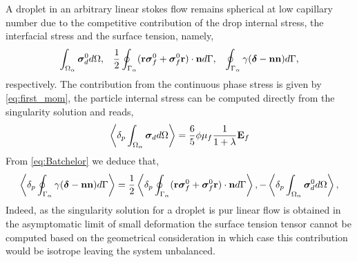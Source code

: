 A droplet in an arbitrary linear stokes flow remains spherical at low capillary number due to the competitive contribution of the drop internal stress, the interfacial stress and the surface tension, namely, 
\begin{align*}
    \int_{\Omega_{\alpha}} \bm{\sigma}_d^0 d\Omega,
    &&\frac{1}{2}\oint_{\Gamma_{\alpha}} (\textbf{r}\bm\sigma_f^0+\bm\sigma_f^0\textbf{r})\cdot \textbf{n} d\Gamma,
    &&\oint_{\Gamma_{\alpha}} \gamma(\bm\delta - \textbf{nn}) d\Gamma,
\end{align*}
respectively. 
The contribution from the continuous phase stress is given by \ref{eq:first_mom}, the particle internal stress can be computed directly from the singularity solution and reads, 
\begin{equation*}
    \left<\delta_{p} \int_{\Omega_{\alpha}} \bm{\sigma}_d d\Omega\right>
    = \frac{6}{5}\phi \mu_f \frac{1}{1+\lambda} \textbf{E}_f
\end{equation*}
From  \ref{eq:Batchelor} we deduce that, 
\begin{equation*}
    \left<\delta_{p} \oint_{\Gamma_{\alpha}} \gamma(\bm\delta - \textbf{nn}) d\Gamma\right>
    = 
    \frac{1}{2}\left<\delta_{p} \oint_{\Gamma_{\alpha}} (\textbf{r}\bm\sigma_f^0+\bm\sigma_f^0\textbf{r})\cdot \textbf{n} d\Gamma\right>,
    - \left<\delta_{p} \int_{\Omega_{\alpha}} \bm{\sigma}_d^0 d\Omega\right>,
\end{equation*}
Indeed, as the singularity solution for a droplet is pur linear flow is obtained in the asymptomatic limit of small deformation the surface tension tensor cannot be computed based on the geometrical consideration in which case this contribution would be isotrope leaving the system unbalanced.

